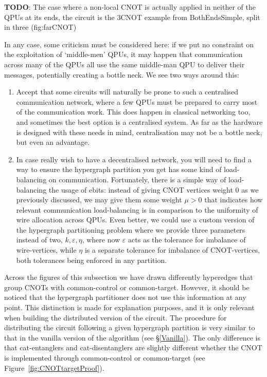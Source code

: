 \textbf{TODO}: The case where a non-local CNOT is actually applied in neither of the QPUs at its ends, the circuit is the 3CNOT example from BothEndsSimple, split in three (fig:farCNOT)

In any case, some criticism must be considered here: if we put no constraint on the exploitation of `middle-men' QPUs, it may happen that communication across many of the QPUs all use the same middle-man QPU to deliver their messages, potentially creating a bottle neck. We see two ways around this:

\begin{enumerate}
\item Accept that some circuits will naturally be prone to such a centralised communication network, where a few QPUs must be prepared to carry most of the communication work. This does happen in classical networking too, and sometimes the best option is a centralised system. As far as the hardware is designed with these needs in mind, centralisation may not be a bottle neck, but even an advantage. 

\item In case really wish to have a decentralised network, you will need to find a way to ensure the hypergraph partition you get has some kind of load-balancing on communication. Fortunately, there is a simple way of load-balancing the usage of ebits: instead of giving CNOT vertices weight \(0\) as we previously discussed, we may give them some weight \(\mu > 0\) that indicates how relevant communication load-balancing is in comparison to the uniformity of wire allocation across QPUs. Even better, we could use a custom version of the hypergraph partitioning problem where we provide three parameters instead of two, \(k,\varepsilon,\eta\), where now \(\varepsilon\) acts as the tolerance for imbalance of wire-vertices, while \(\eta\) is a separate tolerance for imbalance of CNOT-vertices, both tolerances being enforced in any partition.
\end{enumerate}


Across the figures of this subsection we have drawn differently hyperedges that group CNOTs with common-control or common-target. However, it should be noticed that the hypergraph partitioner does not use this information at any point. This distinction is made for explanation purposes, and it is only relevant when building the distributed version of the circuit. The procedure for distributing the circuit following a given hypergraph partition is very similar to that in the vanilla version of the algorithm (see \S\ref{Vanilla}). The only difference is that cat-entanglers and cat-disentanglers are slightly different whether the CNOT is implemented through common-control or common-target (see Figure~\ref{fig:CNOTtargetProof}).

